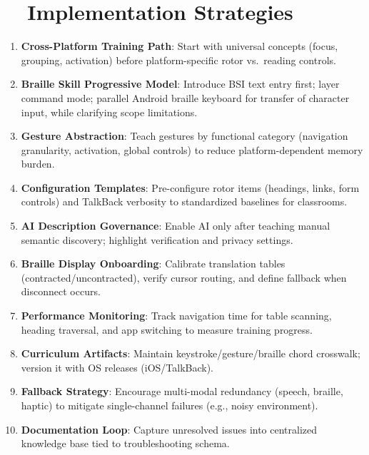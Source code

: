 \section{~~Implementation Strategies}
\label{sec:sr26-implementation}
\begin{enumerate}
	\item \textbf{Cross-Platform Training Path}: Start with universal concepts (focus, grouping, activation) before platform-specific rotor vs.\ reading controls.
	\item \textbf{Braille Skill Progressive Model}: Introduce BSI text entry first; layer command mode; parallel Android braille keyboard for transfer of character input, while clarifying scope limitations.
	\item \textbf{Gesture Abstraction}: Teach gestures by functional category (navigation granularity, activation, global controls) to reduce platform-dependent memory burden.
	\item \textbf{Configuration Templates}: Pre-configure rotor items (headings, links, form controls) and TalkBack verbosity to standardized baselines for classrooms.
	\item \textbf{AI Description Governance}: Enable AI only after teaching manual semantic discovery; highlight verification and privacy settings.
	\item \textbf{Braille Display Onboarding}: Calibrate translation tables (contracted/uncontracted), verify cursor routing, and define fallback when disconnect occurs.
	\item \textbf{Performance Monitoring}: Track navigation time for table scanning, heading traversal, and app switching to measure training progress.
	\item \textbf{Curriculum Artifacts}: Maintain keystroke/gesture/braille chord crosswalk; version it with OS releases (iOS/TalkBack).
	\item \textbf{Fallback Strategy}: Encourage multi-modal redundancy (speech, braille, haptic) to mitigate single-channel failures (e.g., noisy environment).
	\item \textbf{Documentation Loop}: Capture unresolved issues into centralized knowledge base tied to troubleshooting schema.
\end{enumerate}

